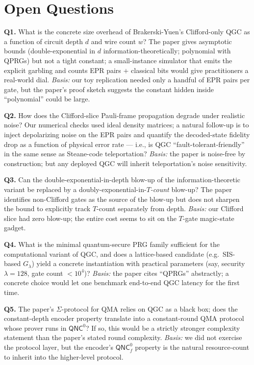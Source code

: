 \section*{Open Questions}
\textbf{Q1.} What is the concrete size overhead of Brakerski-Yuen's Clifford-only QGC as
a function of circuit depth $d$ and wire count $w$? The paper gives asymptotic bounds
(double-exponential in $d$ information-theoretically; polynomial with QPRGs) but not a
tight constant; a small-instance simulator that emits the explicit garbling and counts
EPR pairs $+$ classical bits would give practitioners a real-world dial. \emph{Basis:}
our toy replication needed only a handful of EPR pairs per gate, but the paper's proof
sketch suggests the constant hidden inside ``polynomial'' could be large.

\textbf{Q2.} How does the Clifford-slice Pauli-frame propagation degrade under realistic
noise? Our numerical checks used ideal density matrices; a natural follow-up is to
inject depolarizing noise on the EPR pairs and quantify the decoded-state fidelity drop
as a function of physical error rate --- i.e., is QGC ``fault-tolerant-friendly'' in the
same sense as Steane-code teleportation? \emph{Basis:} the paper is noise-free by
construction; but any deployed QGC will inherit teleportation's noise sensitivity.

\textbf{Q3.} Can the double-exponential-in-depth blow-up of the information-theoretic
variant be replaced by a doubly-exponential-in-\emph{$T$-count} blow-up? The paper
identifies non-Clifford gates as the source of the blow-up but does not sharpen the
bound to explicitly track $T$-count separately from depth. \emph{Basis:} our Clifford
slice had zero blow-up; the entire cost seems to sit on the $T$-gate magic-state gadget.

\textbf{Q4.} What is the minimal quantum-secure PRG family sufficient for the
computational variant of QGC, and does a lattice-based candidate (e.g.\ SIS-based
$G_\lambda$) yield a concrete instantiation with practical parameters (say, security
$\lambda=128$, gate count $<10^4$)? \emph{Basis:} the paper cites ``QPRGs'' abstractly;
a concrete choice would let one benchmark end-to-end QGC latency for the first time.

\textbf{Q5.} The paper's $\Sigma$-protocol for QMA relies on QGC as a black box; does
the constant-depth encoder property translate into a constant-round QMA protocol whose
prover runs in $\mathsf{QNC}^0$? If so, this would be a strictly stronger complexity
statement than the paper's stated round complexity. \emph{Basis:} we did not exercise
the protocol layer, but the encoder's $\mathsf{QNC}^0_f$ property is the natural
resource-count to inherit into the higher-level protocol.
